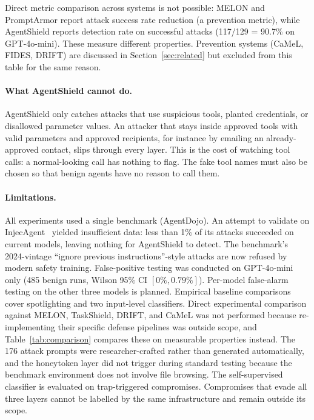 \documentclass[preprint,12pt]{elsarticle}
\begin{document}
Direct metric comparison across systems is not possible: MELON and PromptArmor report attack success rate reduction (a prevention metric), while AgentShield reports detection rate on successful attacks (117/129 = 90.7\% on GPT-4o-mini).
These measure different properties.
Prevention systems (CaMeL, FIDES, DRIFT) are discussed in Section~\ref{sec:related} but excluded from this table for the same reason.

\paragraph{What AgentShield cannot do.}
AgentShield only catches attacks that use suspicious tools, planted credentials, or disallowed parameter values. An attacker that stays inside approved tools with valid parameters and approved recipients, for instance by emailing an already-approved contact, slips through every layer. This is the cost of watching tool calls: a normal-looking call has nothing to flag. The fake tool names must also be chosen so that benign agents have no reason to call them.

\paragraph{Limitations.}
All experiments used a single benchmark (AgentDojo). An attempt to validate on InjecAgent~\citep{zhan2024injecagent} yielded insufficient data: less than 1\% of its attacks succeeded on current models, leaving nothing for AgentShield to detect. The benchmark's 2024-vintage ``ignore previous instructions''-style attacks are now refused by modern safety training. False-positive testing was conducted on GPT-4o-mini only (485 benign runs, Wilson 95\% CI $[0\%, 0.79\%]$). Per-model false-alarm testing on the other three models is planned. Empirical baseline comparisons cover spotlighting and two input-level classifiers. Direct experimental comparison against MELON, TaskShield, DRIFT, and CaMeL was not performed because re-implementing their specific defense pipelines was outside scope, and Table~\ref{tab:comparison} compares these on measurable properties instead. The 176 attack prompts were researcher-crafted rather than generated automatically, and the honeytoken layer did not trigger during standard testing because the benchmark environment does not involve file browsing. The self-supervised classifier is evaluated on trap-triggered compromises. Compromises that evade all three layers cannot be labelled by the same infrastructure and remain outside its scope.
\end{document}

